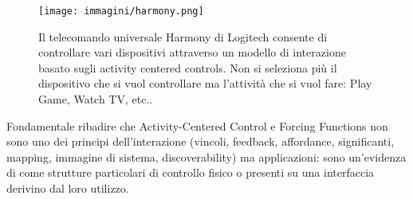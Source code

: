 \begin{figure}[!h]
	\centering
	\texttt{[image: immagini/harmony.png]}
	\caption{Il telecomando universale Harmony di Logitech consente di controllare vari dispositivi attraverso un modello di interazione basato sugli
	activity centered controls. Non si seleziona più il dispositivo che si vuol controllare ma l'attività che si vuol fare: Play Game, Watch TV, etc..}
\end{figure}

Fondamentale ribadire che Activity-Centered Control e Forcing Functions non sono uno dei principi dell'interazione (vincoli, feedback, affordance,
significanti, mapping, immagine di sistema, discoverability) ma applicazioni: sono un'evidenza di come strutture particolari di controllo
fisico o presenti su una interfaccia derivino dal loro utilizzo.